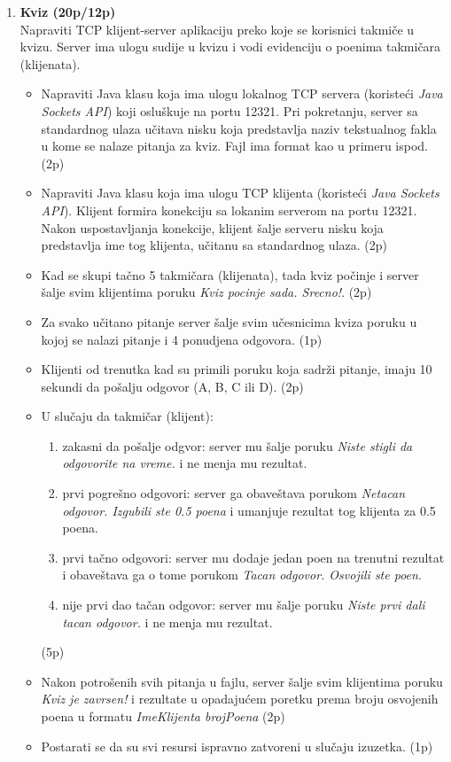 \documentclass[]{article}
\begin{document}
\begin{enumerate}
  
\item \textbf{Kviz (20p/12p)}
\\Napraviti TCP klijent-server aplikaciju preko koje se korisnici takmi\v{c}e u kvizu. Server ima ulogu sudije u kvizu i vodi evidenciju o poenima takmičara (klijenata).
\begin{itemize}
  \item Napraviti Java klasu koja ima ulogu lokalnog TCP servera (koriste\'c{}i \textit{Java Sockets API}) koji oslu\v{s}kuje na portu 12321. Pri pokretanju, server sa standardnog ulaza u\v{c}itava nisku koja predstavlja naziv tekstualnog fakla u kome se nalaze pitanja za kviz. Fajl ima format kao u primeru ispod. \hfill (2p)
  \item Napraviti Java klasu koja ima ulogu TCP klijenta (koriste\'c{}i \textit{Java Sockets API}). Klijent formira konekciju sa lokanim serverom na portu 12321. Nakon uspostavljanja konekcije, klijent \v{s}alje serveru nisku koja predstavlja ime tog klijenta, učitanu sa standardnog ulaza. \hfill (2p)
  \item Kad se skupi ta\v{c}no 5 takmi\v{c}ara (klijenata), tada kviz po\v{c}inje i server \v{s}alje svim klijentima poruku \textit{Kviz pocinje sada. Srecno!}. \hfill (2p)
  \item Za svako u\v{c}itano pitanje server \v{s}alje svim u\v{c}esnicima kviza poruku u kojoj se nalazi pitanje i 4 ponudjena odgovora. \hfill (1p)
  \item Klijenti od trenutka kad su primili poruku koja sadr\v{z}i pitanje, imaju 10 sekundi da po\v{s}alju odgovor (A, B, C ili D). \hfill (2p) 
  \item U slu\v{c}aju da takmi\v{c}ar (klijent):
  \begin{enumerate}
      \item zakasni da po\v{s}alje odgvor: server mu \v{s}alje poruku \textit{Niste stigli da odgovorite na vreme.} i ne menja mu rezultat.
      \item prvi pogre\v{s}no odgovori: server ga obave\v{s}tava porukom \textit{Netacan odgovor. Izgubili ste 0.5 poena} i umanjuje rezultat tog klijenta za 0.5 poena.
      \item prvi ta\v{c}no odgovori: server mu dodaje jedan poen na trenutni rezultat i obave\v{s}tava ga o tome porukom \textit{Tacan odgovor. Osvojili ste poen}.
      \item nije prvi dao ta\v{c}an odgovor: server mu \v{s}alje poruku \textit{Niste prvi dali tacan odgovor.} i ne menja mu rezultat.
  \end{enumerate} \hfill (5p)
  \item Nakon potro\v{s}enih svih pitanja u fajlu, server \v{s}alje svim klijentima poruku \textit{Kviz je zavrsen!} i rezultate u opadajućem poretku prema broju osvojenih poena u formatu \textit{ImeKlijenta brojPoena} \hfill (2p)
  \item Postarati se da su svi resursi ispravno zatvoreni u slu\v{c}aju izuzetka. \hfill (1p)
\end{itemize}


\end{enumerate}
\end{document}
